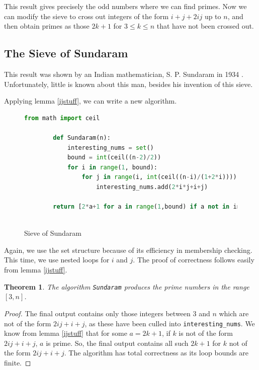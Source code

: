 \documentclass{amsart}
\newtheorem{thm}{Theorem}
\theoremstyle{definition}
\theoremstyle{case}
\begin{document}
	This result gives precisely the odd numbers where we can find primes. Now we can modify the sieve to cross out integers of the form $i+j+2ij$ up to $n$, and then obtain primes as those $2k+1$ for $3 \leq k \leq n$ that have not been crossed out.
	
	\subsection{The Sieve of Sundaram}
	
	This result was shown by an Indian mathematician, S. P. Sundaram in 1934 \cite[p.~158]{ogilvyanderson}. Unfortunately, little is known about this man, besides his invention of this sieve. 
	
	Applying lemma \ref{ijstuff}, we can write a new algorithm.

	\begin{figure}[H]\caption{Sieve of Sundaram}
		\begin{lstlisting}[language=Python]
        from math import ceil
        
        def Sundaram(n):
            interesting_nums = set()
            bound = int(ceil((n-2)/2))
            for i in range(1, bound):
                for j in range(i, int(ceil((n-i)/(1+2*i)))):
                    interesting_nums.add(2*i*j+i+j)
        
        return [2*a+1 for a in range(1,bound) if a not in interesting_nums]
        
		\end{lstlisting}
	\end{figure}

	Again, we use the set structure because of its efficiency in membership checking. This time, we use nested loops for $i$ and $j$. The proof of correctness follows easily from lemma \ref{ijstuff}.
	
	\begin{thm}
		The algorithm \texttt{Sundaram} produces the prime numbers in the range $[3, n]$.
	\end{thm}
	\begin{proof}
		The final output contains only those integers between $3$ and $n$ which are not of the form $2ij+i+j$, as these have been culled into \texttt{interesting\_nums}. We know from lemma \ref{ijstuff} that for some $a=2k+1$, if $k$ is not of the form $2ij+i+j$, $a$ is prime. So, the final output contains all such $2k+1$ for $k$ not of the form $2ij+i+j$. The algorithm has total correctness as its loop bounds are finite.
	\end{proof}
	
\end{document}
